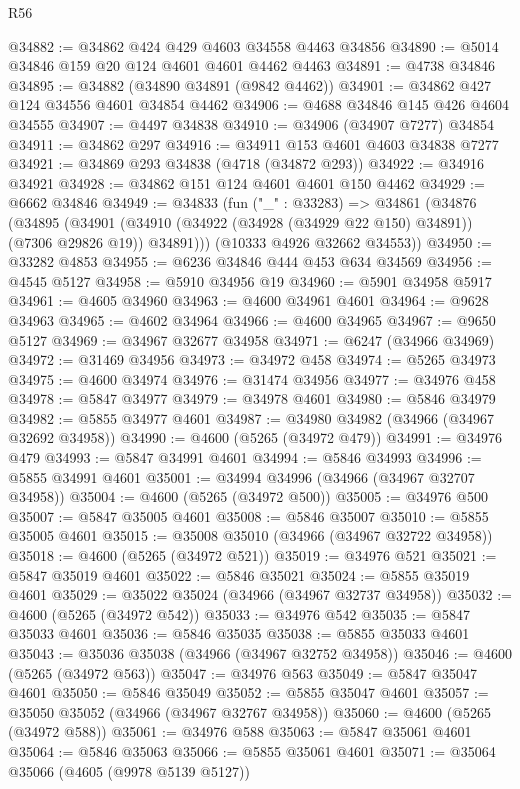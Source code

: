 \begin{lexlean}{R56}
\begin{coremodule}
@34882 := @34862 @424 @429 @4603 @34558 @4463 @34856
@34890 := @5014 @34846 @159 @20 @124 @4601 @4601 @4462 @4463
@34891 := @4738 @34846
@34895 := @34882 (@34890 @34891 (@9842 @4462))
@34901 := @34862 @427 @124 @34556 @4601 @34854 @4462
@34906 := @4688 @34846 @145 @426 @4604 @34555
@34907 := @4497 @34838
@34910 := @34906 (@34907 @7277) @34854
@34911 := @34862 @297
@34916 := @34911 @153 @4601 @4603 @34838 @7277
@34921 := @34869 @293 @34838 (@4718 (@34872 @293))
@34922 := @34916 @34921
@34928 := @34862 @151 @124 @4601 @4601 @150 @4462
@34929 := @6662 @34846
@34949 := @34833
    (fun ("_" : @33283) =>
    @34861
      (@34876
        (@34895
          (@34901 (@34910 (@34922 (@34928 (@34929 @22 @150) @34891)) (@7306 @29826 @19)) @34891)))
      (@10333 @4926 @32662 @34553))
@34950 := @33282 @4853
@34955 := @6236 @34846 @444 @453 @634 @34569
@34956 := @4545 @5127
@34958 := @5910 @34956 @19
@34960 := @5901 @34958 @5917
@34961 := @4605 @34960
@34963 := @4600 @34961 @4601
@34964 := @9628 @34963
@34965 := @4602 @34964
@34966 := @4600 @34965
@34967 := @9650 @5127
@34969 := @34967 @32677 @34958
@34971 := @6247 (@34966 @34969)
@34972 := @31469 @34956
@34973 := @34972 @458
@34974 := @5265 @34973
@34975 := @4600 @34974
@34976 := @31474 @34956
@34977 := @34976 @458
@34978 := @5847 @34977
@34979 := @34978 @4601
@34980 := @5846 @34979
@34982 := @5855 @34977 @4601
@34987 := @34980 @34982 (@34966 (@34967 @32692 @34958))
@34990 := @4600 (@5265 (@34972 @479))
@34991 := @34976 @479
@34993 := @5847 @34991 @4601
@34994 := @5846 @34993
@34996 := @5855 @34991 @4601
@35001 := @34994 @34996 (@34966 (@34967 @32707 @34958))
@35004 := @4600 (@5265 (@34972 @500))
@35005 := @34976 @500
@35007 := @5847 @35005 @4601
@35008 := @5846 @35007
@35010 := @5855 @35005 @4601
@35015 := @35008 @35010 (@34966 (@34967 @32722 @34958))
@35018 := @4600 (@5265 (@34972 @521))
@35019 := @34976 @521
@35021 := @5847 @35019 @4601
@35022 := @5846 @35021
@35024 := @5855 @35019 @4601
@35029 := @35022 @35024 (@34966 (@34967 @32737 @34958))
@35032 := @4600 (@5265 (@34972 @542))
@35033 := @34976 @542
@35035 := @5847 @35033 @4601
@35036 := @5846 @35035
@35038 := @5855 @35033 @4601
@35043 := @35036 @35038 (@34966 (@34967 @32752 @34958))
@35046 := @4600 (@5265 (@34972 @563))
@35047 := @34976 @563
@35049 := @5847 @35047 @4601
@35050 := @5846 @35049
@35052 := @5855 @35047 @4601
@35057 := @35050 @35052 (@34966 (@34967 @32767 @34958))
@35060 := @4600 (@5265 (@34972 @588))
@35061 := @34976 @588
@35063 := @5847 @35061 @4601
@35064 := @5846 @35063
@35066 := @5855 @35061 @4601
@35071 := @35064 @35066 (@4605 (@9978 @5139 @5127))

\end{coremodule}
\end{lexlean}
